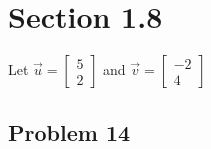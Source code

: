 \documentclass[12pt, letterpaper]{article}
\theoremstyle{statement}
\begin{document}
            \section*{Section 1.8}
            
            Let $\vec{u} = \begin{bmatrix} 5\\2\end{bmatrix}$ and $\vec{v} = \begin{bmatrix} -2\\4\end{bmatrix}$
            
            \subsection*{Problem 14}
            
\end{document}

